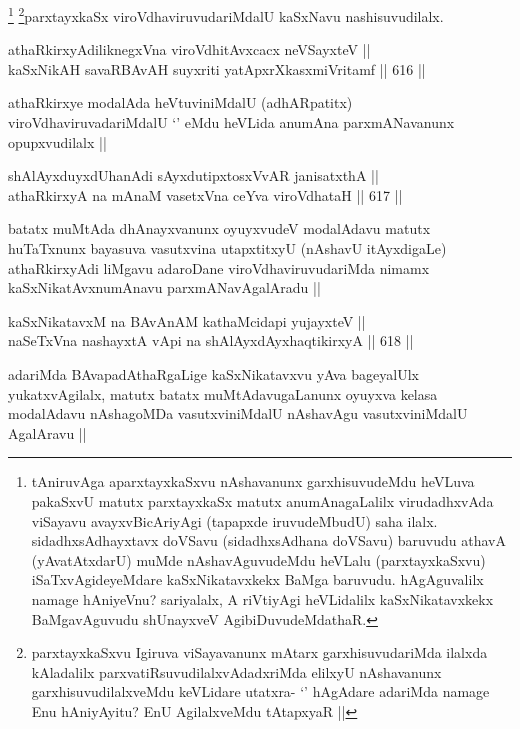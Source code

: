\begin{artha}
\footnote{tAniruvAga aparxtayxkaSxvu nAshavanunx garxhisuvudeMdu heVLuva pakaSxvU matutx parxtayxkaSx matutx anumAnagaLalilx virudadhxvAda viSayavu avayxvBicAriyAgi (tapapxde iruvudeMbudU) saha ilalx. sidadhxsAdhayxtavx doVSavu (sidadhxsAdhana doVSavu) baruvudu athavA (yAvatAtxdarU) muMde nAshavAguvudeMdu heVLalu (parxtayxkaSxvu) iSaTxvAgideyeMdare kaSxNikatavxkekx BaMga baruvudu. hAgAguvalilx namage hAniyeVnu? sariyalalx, A riVtiyAgi heVLidalilx kaSxNikatavxkekx BaMgavAguvudu shUnayxveV AgibiDuvudeMdathaR.}
\footnote{parxtayxkaSxvu Igiruva viSayavanunx mAtarx garxhisuvudariMda ilalxda kAladalilx parxvatiRsuvudilalxvAdadxriMda elilxyU nAshavanunx garxhisuvudilalxveMdu keVLidare utatxra- `\stext' hAgAdare adariMda namage Enu hAniyAyitu? EnU AgilalxveMdu tAtapxyaR ||}parxtayxkaSx viroVdhaviruvudariMdalU kaSxNavu nashisuvudilalx.
\end{artha}

\begin{shl}
athaRkirxyAdiliknegxVna viroVdhitAvxcacx neVSayxteV || \\
kaSxNikAH savaRBAvAH suyxriti yatApxrXkasxmiVritamf ||  616 || 
\end{shl}

\begin{artha}
athaRkirxye modalAda heVtuviniMdalU (adhARpatitx) viroVdhaviruvadariMdalU `\stext' eMdu heVLida anumAna parxmANavanunx opupxvudilalx ||
\end{artha}


\begin{shl}
shAlAyxduyxdUhanAdi sAyxdutipxtosxVvAR janisatxthA || \\
athaRkirxyA na mAnaM vasetxVna ceYva viroVdhataH ||  617 ||  
\end{shl}

\begin{artha}
batatx muMtAda dhAnayxvanunx oyuyxvudeV modalAdavu matutx huTaTxnunx bayasuva vasutxvina utapxtitxyU (nAshavU itAyxdigaLe) athaRkirxyAdi liMgavu adaroDane viroVdhaviruvudariMda nimamx kaSxNikatAvxnumAnavu parxmANavAgalAradu ||
\end{artha}

\begin{shl}
kaSxNikatavxM na BAvAnAM kathaMcidapi yujayxteV || \\
naSeTxVna nashayxtA vA\s pi na shAlAyxdAyxhaqtikirxyA ||  618 ||  
\end{shl}

\begin{artha}
adariMda BAvapadAthaRgaLige kaSxNikatavxvu yAva bageyalUlx yukatxvAgilalx, matutx batatx muMtAdavugaLanunx oyuyxva kelasa modalAdavu nAshagoMDa vasutxviniMdalU nAshavAgu vasutxviniMdalU AgalAravu ||
\end{artha}

